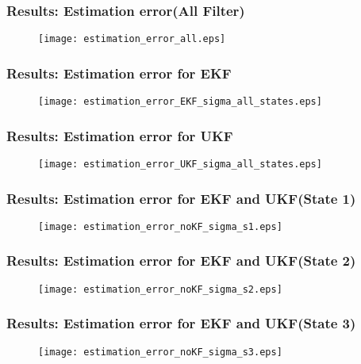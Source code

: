 \documentclass{beamer}
\begin{document}
\begin{frame}
\frametitle{Results: Estimation error(All Filter)}

\begin{figure}
\texttt{[image: estimation\_error\_all.eps]}
\end{figure}
\end{frame}
\begin{frame}
\frametitle{Results: Estimation error for EKF}

\begin{figure}
\texttt{[image: estimation\_error\_EKF\_sigma\_all\_states.eps]}
\end{figure}
\end{frame}
\begin{frame}
\frametitle{Results: Estimation error for UKF}

\begin{figure}
\texttt{[image: estimation\_error\_UKF\_sigma\_all\_states.eps]}
\end{figure}
\end{frame}
\begin{frame}
\frametitle{Results: Estimation error for EKF and UKF(State 1)}
\begin{figure}
\texttt{[image: estimation\_error\_noKF\_sigma\_s1.eps]}
\end{figure}
\end{frame}
\begin{frame}
\frametitle{Results: Estimation error for EKF and UKF(State 2)}
\begin{figure}
\texttt{[image: estimation\_error\_noKF\_sigma\_s2.eps]}
\end{figure}
\end{frame}
\begin{frame}
\frametitle{Results: Estimation error for EKF and UKF(State 3)}
\begin{figure}
\texttt{[image: estimation\_error\_noKF\_sigma\_s3.eps]}
\end{figure}
\end{frame}
\end{document}
